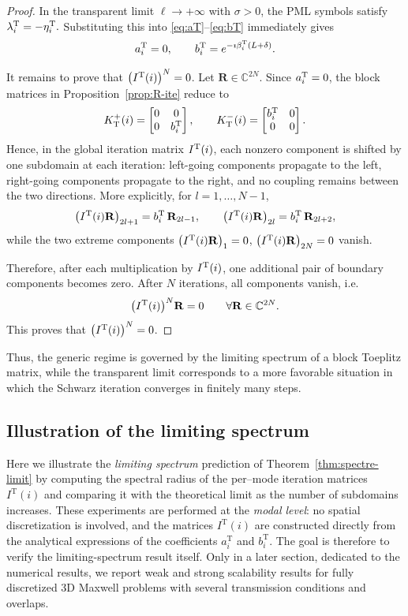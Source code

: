 \documentclass[smallextended]{svjour3}       %
\begin{document}
\begin{proof}
In the transparent limit \(\ell\to+\infty\) with \(\sigma>0\), the PML symbols satisfy
\(
\lambda_i^{\rm T}=-\eta_i^{\rm T}.
\)
Substituting this into \eqref{eq:aT}--\eqref{eq:bT} immediately gives
\[
a_i^{\rm T}=0,
\qquad
b_i^{\rm T}=e^{-\imath \beta_i^{\rm T}(L+\delta)}.
\]

It remains to prove that \(\bigl(I^{\rm T}(i)\bigr)^N=0\). Let \(\mathbf R\in\mathbb C^{2N}\). Since \(a_i^{\rm T}=0\), the block matrices in Proposition~\ref{prop:R-ite} reduce to
\[
K_{\rm T}^+(i)=
\begin{bmatrix}
0&0\\
0&b_i^{\rm T}
\end{bmatrix},
\qquad
K_{\rm T}^-(i)=
\begin{bmatrix}
b_i^{\rm T}&0\\
0&0
\end{bmatrix}.
\]
Hence, in the global iteration matrix \(I^{\rm T}(i)\), each nonzero component is shifted by one subdomain at each iteration: left-going components propagate to the left, right-going components propagate to the right, and no coupling remains between the two directions. More explicitly, for \(l=1,\dots,N-1\),
\[
\bigl(I^{\rm T}(i)\mathbf R\bigr)_{2l+1}
=
b_i^{\rm T}\,\mathbf R_{2l-1},
\qquad
\bigl(I^{\rm T}(i)\mathbf R\bigr)_{2l}
=
b_i^{\rm T}\,\mathbf R_{2l+2},
\]
while the two extreme components 
\(
\bigl(I^{\rm T}(i)\mathbf R\bigr)_1=0\), \(\bigl(I^{\rm T}(i)\mathbf R\bigr)_{2N}=0\) vanish.

Therefore, after each multiplication by \(I^{\rm T}(i)\), one additional pair of boundary components becomes zero. After \(N\) iterations, all components vanish, i.e.
\[
\bigl(I^{\rm T}(i)\bigr)^N\mathbf R=0
\qquad
\forall \mathbf R\in\mathbb C^{2N}.
\]
This proves that \(\bigl(I^{\rm T}(i)\bigr)^N=0\).
\end{proof}
Thus, the generic regime is governed by the limiting spectrum of a block Toeplitz matrix, while the transparent limit corresponds to a more favorable situation in which the Schwarz iteration converges in finitely many steps.

\subsection{Illustration of the limiting spectrum}
\label{subsec:limspec}

Here we illustrate the \emph{limiting spectrum}
prediction of Theorem~\ref{thm:spectre-limit} by computing the spectral radius of the
per–mode iteration matrices \(I^{\mathrm T}(i)\) and comparing it with the theoretical
limit as the number of subdomains increases. These experiments are performed at the
\emph{modal level}: no spatial discretization is involved, and the matrices
\(I^{\mathrm T}(i)\) are constructed directly from the analytical expressions of the
coefficients \(a_i^{\mathrm T}\) and \(b_i^{\mathrm T}\). The goal is therefore to
verify the limiting-spectrum result itself. Only in a later section, dedicated to the numerical results, we report weak and strong scalability results for
fully discretized 3D Maxwell problems with several transmission conditions and overlaps.
\end{document}
